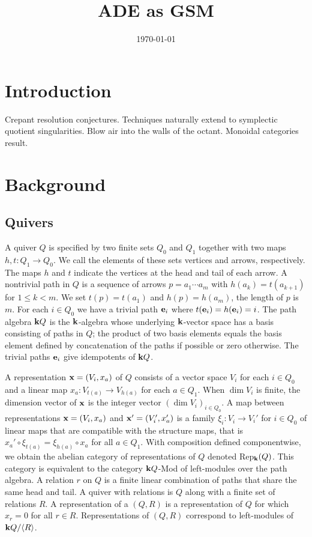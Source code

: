 \documentclass{amsart}
\title{ADE as GSM}
\date{\today}
\theoremstyle{definition}
\begin{document}
\maketitle

\section{Introduction}
Crepant resolution conjectures.
Techniques naturally extend to symplectic quotient singularities.
Blow air into the walls of the octant.
Monoidal categories result.


\section{Background}\label{sc:background}

\subsection{Quivers}
A quiver $Q$ is specified by two finite sets $Q_0$ and $Q_1$ together with two maps $h, t \colon Q_1 \rightarrow Q_0$. We call the elements of these sets vertices and arrows, respectively.  The maps $h$ and $t$ indicate the vertices at the head and tail of each arrow.
A nontrivial path in $Q$ is a sequence of arrows $p = a_1 \dotsb a_m$ with $h(a_{k}) = t(a_{k+1})$ for $1 \leq k < m$.  We set $t(p) = t(a_{1})$ and $h(p)= h(a_m)$, the length of $p$ is $m$.  
For each $i \in Q_0$ we have a trivial path $\mathbf{e}_i$ where $t(\mathbf{e}_i) = h(\mathbf{e}_i) = i$.  
The path algebra $\mathbf{k} Q$ is the $\mathbf{k}$-algebra whose underlying $\mathbf{k}$-vector space has a basis consisting of paths in $Q$; the product of two basis elements equals the basis element defined by concatenation of the paths if possible or zero otherwise.
The trivial paths $\mathbf{e}_i$ give idempotents of $\mathbf{k} Q$.

A representation $\mathbf{x} = (V_i, x_a)$ of $Q$ consists of a vector space $V_i$ for each $i \in Q_0$ and a linear map $x_a \colon V_{t(a)} \rightarrow V_{h(a)}$ for each $a \in Q_1$. 
When $\dim V_i$ is finite, the dimension vector of $\mathbf{x}$ is the integer vector $(\dim V_{i})_{i\in Q_0}$.  
A map between representations $\mathbf{x} = (V_i, x_a)$ and $\mathbf{x}' = (V_i', x_a')$ is a family $\xi_{i} \colon V_i^{\,} \rightarrow V_i'$ for $i \in Q_0$ of linear maps that are compatible with the structure maps, that is $x_a' \circ\xi_{t(a)} = \xi_{h(a)} \circ x_a$ for all $a \in Q_1$.  
With composition defined componentwise, we obtain the abelian category of representations of $Q$ denoted Rep$_{\mathbf{k}}(Q)$. 
This category is equivalent to the category $\mathbf{k} Q$-Mod of left-modules over the path algebra.
A relation $r$ on $Q$ is a finite linear combination of paths that share the same head and tail.
A quiver with relations is $Q$ along with a finite set of relations $R$.
A representation of a $(Q,R)$ is a representation of $Q$ for which $x_r=0$ for all $r\in R$.
Representations of $(Q,R)$ correspond to left-modules of $\mathbf{k} Q/ \langle R \rangle$.
\end{document}
